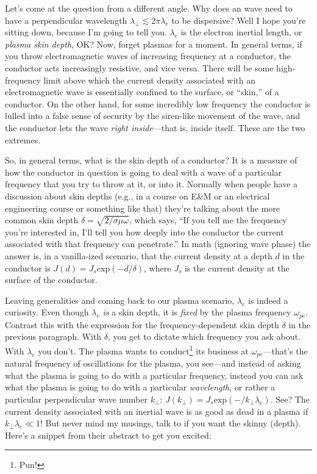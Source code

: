 Let's come at the question from a different angle. Why does an \Alf wave need to
have a perpendicular wavelength $\lambda_\perp \lesssim 2 \pi \lambda_e$ to be
dispersive? Well I hope you're sitting down, because I'm going to tell
you. $\lambda_e$ is the electron inertial length, or \emph{plasma skin depth},
OK? Now, forget plasmas for a moment. In general terms, if you throw
electromagnetic waves of increasing frequency at a conductor, the conductor acts
increasingly resistive, and vice versa. There will be some high-frequency limit
above which the current density associated with an electromagnetic wave is
essentially confined to the surface, or ``skin,'' of a conductor. On the other
hand, for some incredibly low frequency the conductor is lulled into a false
sense of security by the siren-like movement of the wave, and the conductor lets
the wave \emph{right inside}---that is, inside itself. These are the two
extremes.

So, in general terms, what is the skin depth of a conductor? It is a measure of
how the conductor in question is going to deal with a wave of a particular
frequency that you try to throw at it, or into it. Normally when people have a
discussion about skin depths (e.g., in a course on E\&M or an electrical
engineering course or something like that) they're talking about the more common
skin depth $\delta = \sqrt{2 / \sigma \mu \omega}$, which says, ``If you tell me
the frequency you're interested in, I'll tell you how deeply into the conductor
the current associated with that frequency can penetrate.'' In math (ignoring
wave phase) the answer is, in a vanilla-ized scenario, that the current density
at a depth $d$ in the conductor is $J (d) = J_s \mathrm{exp} ( - d / \delta )$,
where $J_s$ is the current density at the surface of the conductor.

Leaving generalities and coming back to our plasma scenario, $\lambda_e$ is
indeed a curiosity. Even though $\lambda_e$ \emph{is} a skin depth, it is
\emph{fixed} by the plasma frequency $\omega_{pe}$. Contrast this with the
expression for the frequency-dependent skin depth $\delta$ in the previous
paragraph. With $\delta$, you get to dictate which frequency you ask about. With
$\lambda_e$ you don't. The plasma wants to conduct\footnote{Pun!} its business
at $\omega_{pe}$---that's the natural frequency of oscillations for the plasma,
you see---and instead of asking what the plasma is going to do with a particular
frequency, instead you can ask what the plasma is going to do with a particular
\emph{wavelength}, or rather a particular perpendicular wave number $k_\perp$:
$J ( k_\perp ) = J_s \mathrm{exp} ( - / k_\perp \lambda_e )$.  See? The current
density associated with an inertial \Alf wave is as good as dead in a plasma if
$k_\perp \lambda_e \ll 1$! But never mind my musings, talk to
\citet{Morales1994} if you want the skinny (depth). Here's a snippet from their
abstract to get you excited:

